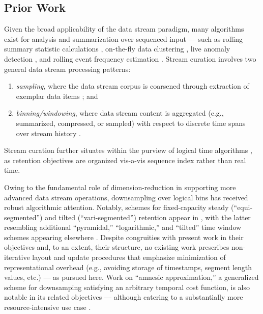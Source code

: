 \subsection{Prior Work}
\label{sec:prior-work}

Given the broad applicability of the data stream paradigm, many algorithms exist for analysis and summarization over sequenced input --- such as rolling summary statistic calculations \citep{lin2004continuously}, on-the-fly data clustering \citep{silva2013data}, live anomaly detection \citep{cai2004maids}, and rolling event frequency estimation \citep{manku2002approximate}.
Stream curation involves two general data stream processing patterns:
\begin{enumerate}
\item \textit{sampling}, where the data stream corpus is coarsened through extraction of exemplar data items \citep{sibai2016sampling}; and
\item \textit{binning/windowing}, where data stream content is aggregated (e.g., summarized, compressed, or sampled) with respect to discrete time spans over stream history \citep{gama2007data}.
\end{enumerate}
Stream curation further situates within the purview of logical time algorithms \citep{sibai2016sampling}, as retention objectives are organized vis-a-vis sequence index rather than real time.

Owing to the fundamental role of dimension-reduction in supporting more advanced data stream operations, downsampling over logical bins has received robust algorithmic attention.
Notably, schemes for fixed-capacity steady (``equi-segmented'') and tilted (``vari-segmented'') retention appear in \citep{zhao2005generalized}, with the latter resembling additional ``pyramidal,'' ``logarithmic,'' and ``tilted'' time window schemes appearing elsewhere \citep{aggarwal2003framework,han2005stream,giannella2003mining,phithakkitnukoon2010recent}.
Despite congruities with present work in their objectives and, to an extent, their structure, no existing work prescribes non-iterative layout and update procedures that emphasize minimization of representational overhead (e.g., avoiding storage of timestamps, segment length values, etc.) --- as pursued here.
Work on ``amnesic approximation,'' a generalized scheme for downsamping satisfying an arbitrary temporal cost function, is also notable in its related objectives --- although catering to a substantially more resource-intensive use case \citep{palpanas2004online}.


